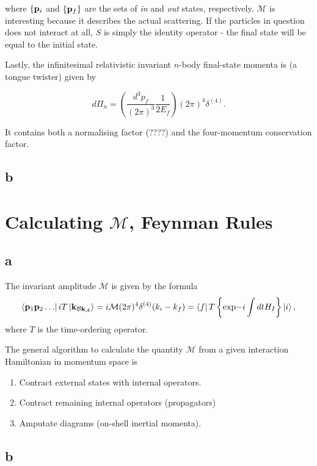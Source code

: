 \documentclass[11pt, a4paper]{amsart}
\begin{document}
where $\{\vb{p}_i$ and $\{\vb{p}_f\}$ are the sets of \emph{in} and \emph{out} states, respectively. $\mathcal{M}$ is interesting because it describes the actual scattering. If the particles in question does not interact at all, $S$ is simply the identity operator - the final state will be equal to the initial state.

Lastly, the infinitesimal relativistic invariant $n$-body final-state momenta is (a tongue twister) given by

\begin{equation}
d\Pi_n = \left(\frac{d^3p_f}{(2\pi)^3} \frac{1}{2E_f}\right) (2\pi)^4 \delta^(4).
\end{equation}

It contains both a normalising factor (????) and the four-momentum conservation factor.

\subsection*{b}

\section{Calculating $\mathcal{M}$, Feynman Rules}

\subsection*{a}

The invariant amplitude $\mathcal{M}$ is given by the formula
\begin{equation}
\bra{\vb{p}_1 \vb{p}_2 \dots} iT \ket{\vb{k}_{\mathcal{B}\vb{k}_{\mathcal{A}}}} = i \mathcal{M} (2\pi)^4 \delta^{(4)}(k_i - k_f) 
= \bra{f}T\left\{\text{exp}{-i\int dt H_I} \right\} \ket{i},
\end{equation}
where $T$ is the time-ordering operator.

The general algorithm to calculate the quantity $\mathcal{M}$ from a given interaction Hamiltonian in momentum space is
\begin{enumerate}
\item Contract external states with internal operators.
\item Contract remaining internal operators (propagators)
\item Amputate diagrams (on-shell inertial momenta).
\end{enumerate}

\subsection*{b}
\end{document}
